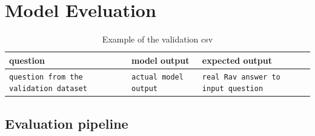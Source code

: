 \documentclass[11pt]{article}
\begin{document}
\section{Model Eveluation}

\begin{table}
\centering
\begin{tabular}{lll}
\hline
\textbf{question} & \textbf{model output} & \textbf{expected output}\\
\hline
\verb|question from the validation dataset| & \verb|actual model output| & \verb|real Rav answer to input question| \\
\hline
\end{tabular}
\caption{\label{validation csv example}
Example of the validation csv 
}
\end{table}


\subsection{Evaluation pipeline}
\end{document}
